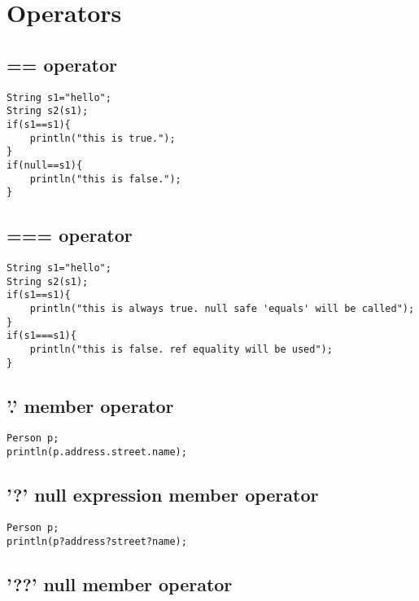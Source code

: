 \documentclass{tufte-book}
\begin{document}
            \section{Operators}
            \subsection{== operator}
            \begin{lstlisting}
String s1="hello";
String s2(s1);
if(s1==s1){
    println("this is true.");
}
if(null==s1){
    println("this is false.");
}
            \end{lstlisting}


            \subsection{=== operator}
            \begin{lstlisting}
String s1="hello";
String s2(s1);
if(s1==s1){
    println("this is always true. null safe 'equals' will be called");
}
if(s1===s1){
    println("this is false. ref equality will be used");
}
            \end{lstlisting}


            \subsection{'.' member operator}
            
            \begin{lstlisting}
Person p;
println(p.address.street.name);
            \end{lstlisting}

            \subsection{'?' null expression member operator}
            
            \begin{lstlisting}
Person p;
println(p?address?street?name);
            \end{lstlisting}


            \subsection{'??' null member operator}
            
\end{document}
